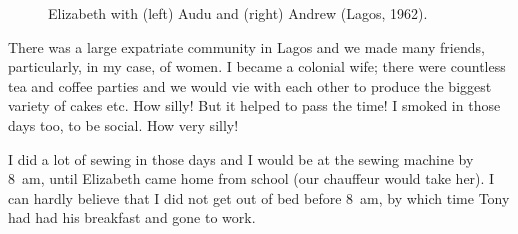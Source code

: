\begin{figure}
  \centering
  \caption{Elizabeth with (left) Audu and (right) Andrew (Lagos,
    1962).}
\end{figure}

There was a large expatriate community in Lagos and we made many
friends, particularly, in my case, of women. I became a colonial wife;
there were countless tea and coffee parties and we would vie with each
other to produce the biggest variety of cakes etc. How silly! But it
helped to pass the time! I smoked in those days too, to be social. How
very silly!

I did a lot of sewing in those days and I would be at the sewing
machine by 8~am, until Elizabeth came home from school (our chauffeur
would take her). I can hardly believe that I did not get out of bed
before 8~am, by which time Tony had had his breakfast and gone to
work.


